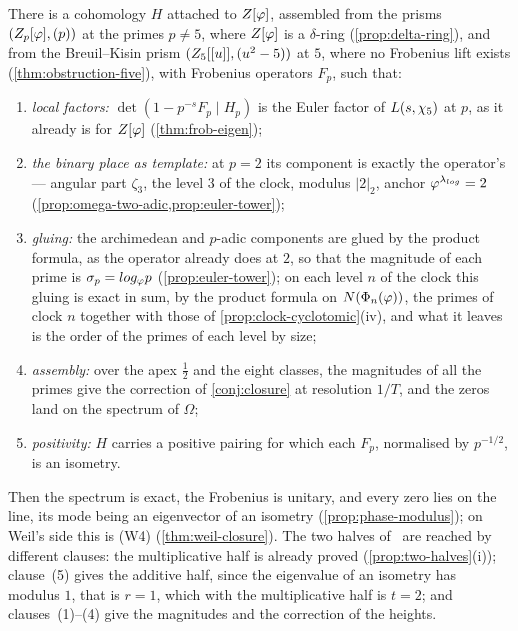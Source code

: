 \begin{conjecture}\label{conj:prismatic-route}
There is a cohomology $H$ attached to $Z[\varphi]$, assembled from the prisms $(Z_p[\varphi],(p))$ at the
primes $p\neq5$, where $Z[\varphi]$ is a $\delta$-ring (\cref{prop:delta-ring}), and from the Breuil--Kisin prism $(Z_5[[u]],(u^2-5))$ at $5$, where no Frobenius lift exists (\cref{thm:obstruction-five}), with Frobenius
operators $F_p$, such that:
\begin{enumerate}[label=\textup{(\arabic*)}]
  \item \emph{local factors:} $\det(1-p^{-s}F_p\mid H_p)$ is the Euler factor of $L(s,\chi_5)$ at $p$,
    as it already is for $Z[\varphi]$ (\cref{thm:frob-eigen});
  \item \emph{the binary place as template:} at $p=2$ its component is exactly the operator's ---
    angular part $\zeta_3$, the level $3$ of the clock,
modulus $|2|_2$, anchor $\varphi^{\lambda_{log}}=2$ (\cref{prop:omega-two-adic,prop:euler-tower});
    \item \emph{gluing:} the archimedean and $p$-adic
    components are glued by the product formula, as the
    operator already does at $2$, so that the magnitude
    of each prime is $\sigma_p=log_\varphi p$
    (\cref{prop:euler-tower}); on each level $n$ of the
    clock this gluing is exact in sum, by the product
    formula on $N(\Phi_n(\varphi))$, the primes of
    clock $n$ together with those of
    \cref{prop:clock-cyclotomic}(iv),
    and what it leaves is the order of the primes of each
    level by size;

  \item \emph{assembly:} over the apex $\tfrac12$ and the eight classes, the magnitudes of all the
    primes give the correction of \cref{conj:closure} at resolution $1/T$, and the zeros land on the
    spectrum of $\hat\Omega$;
  \item \emph{positivity:} $H$ carries a positive pairing for which each $F_p$, normalised by $p^{-1/2}$,
    is an isometry.
\end{enumerate}
Then the spectrum is exact, the Frobenius is unitary, and every zero lies on the line, its mode being
an eigenvector of an isometry (\cref{prop:phase-modulus}); on Weil's side this is (W4)
(\cref{thm:weil-closure}).  The two halves of \Ecore\ are reached by different clauses:
the multiplicative half is already proved (\cref{prop:two-halves}(i)); clause~(5) gives the
additive half, since the eigenvalue of an isometry has modulus $1$, that is $r=1$, which with the
multiplicative half is $t=2$; and clauses~(1)--(4) give the magnitudes and the correction of the
heights.
\end{conjecture}

